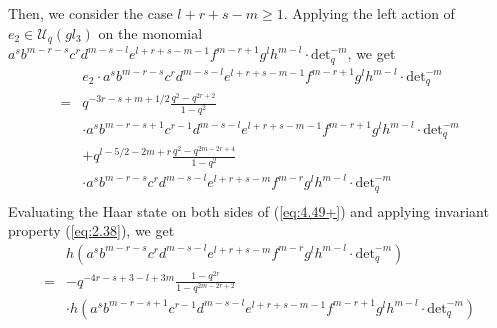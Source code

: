 \documentclass[table,a4paper,reqno]{amsart}
\numberwithin{equation}{section}
\theoremstyle{definition}
\begin{document}
Then, we consider the case $l+r+s-m\ge 1$. Applying the left action of $e_2\in\mathcal{U}_q(gl_3)$ on the monomial $a^sb^{m-r-s}c^{r}d^{m-s-l}e^{l+r+s-m-1}f^{m-r+1}g^{l}h^{m-l}\cdot\text{det}_q^{-m}$, we get
\begin{equation}\label{eq:4.49+}
    \begin{split}
        &e_2\cdot a^sb^{m-r-s}c^{r}d^{m-s-l}e^{l+r+s-m-1}f^{m-r+1}g^{l}h^{m-l}\cdot\text{det}_q^{-m}\\
        =&q^{-3r-s+m+1/2}\frac{q^2-q^{2r+2}}{1-q^2}\\
        &\cdot a^sb^{m-r-s+1}c^{r-1}d^{m-s-l}e^{l+r+s-m-1}f^{m-r+1}g^{l}h^{m-l}\cdot\text{det}_q^{-m}\\
        &+q^{l-5/2-2m+r}\frac{q^2-q^{2m-2r+4}}{1-q^2}\\
        &\cdot a^sb^{m-r-s}c^{r}d^{m-s-l}e^{l+r+s-m}f^{m-r}g^{l}h^{m-l}\cdot\text{det}_q^{-m}\\
    \end{split}
\end{equation}
Evaluating the Haar state on both sides of (\ref{eq:4.49+}) and applying invariant property (\ref{eq:2.38}), we get
\begin{equation}\label{eq:4.50+}
    \begin{split}
        &h\left(a^sb^{m-r-s}c^{r}d^{m-s-l}e^{l+r+s-m}f^{m-r}g^{l}h^{m-l}\cdot\text{det}_q^{-m}\right)\\
        =&-q^{-4r-s+3-l+3m}\frac{1-q^{2r}}{1-q^{2m-2r+2}}\\
        &\cdot h\left(a^sb^{m-r-s+1}c^{r-1}d^{m-s-l}e^{l+r+s-m-1}f^{m-r+1}g^{l}h^{m-l}\cdot\text{det}_q^{-m}\right)
    \end{split}
\end{equation}
\end{document}

